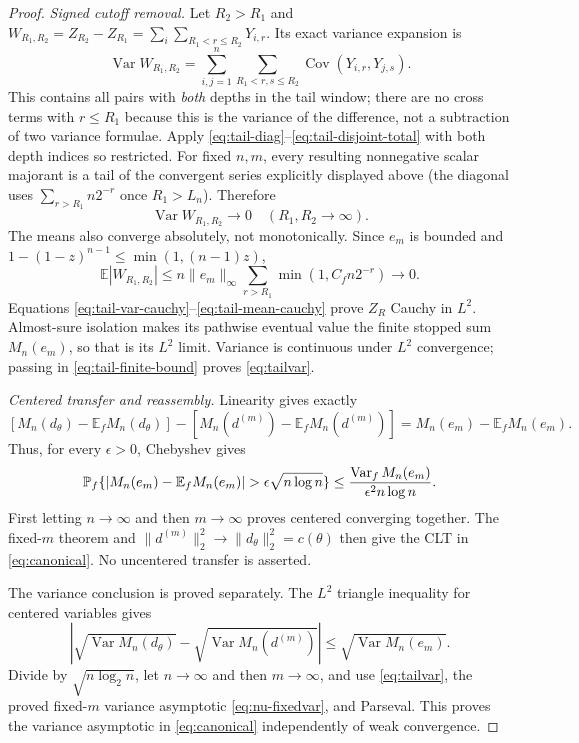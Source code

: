 \documentclass[11pt]{article}
\numberwithin{equation}{section}
\newcommand{\E}{\mathbb E}\newcommand{\Pp}{\mathbb P}
\newcommand{\Var}{\operatorname{Var}}\newcommand{\Cov}{\operatorname{Cov}}
\newcommand{\1}{\mathbf 1}\newcommand{\F}{\mathcal F}\newcommand{\D}{\mathcal D}
\newcommand{\norm}[1]{\lVert#1\rVert}
\begin{document}
\begin{proof}
\emph{Signed cutoff removal.}
Let $R_2>R_1$ and
$W_{R_1,R_2}=Z_{R_2}-Z_{R_1}=\sum_i\sum_{R_1<r\le R_2}Y_{i,r}$.
Its exact variance expansion is
\[
 \Var W_{R_1,R_2}=\sum_{i,j=1}^n
 \sum_{R_1<r,s\le R_2}\Cov(Y_{i,r},Y_{j,s}).
\]
This contains all pairs with \emph{both} depths in the tail window; there are
no cross terms with $r\le R_1$ because this is the variance of the difference,
not a subtraction of two variance formulae.  Apply
\eqref{eq:tail-diag}--\eqref{eq:tail-disjoint-total} with both depth indices
so restricted.  For fixed $n,m$, every resulting nonnegative scalar
majorant is a tail of the convergent series explicitly displayed above
(the diagonal uses $\sum_{r>R_1}n2^{-r}$ once $R_1>L_n$).  Therefore
\begin{equation}\label{eq:tail-var-cauchy}
 \Var W_{R_1,R_2}\longrightarrow0
 \quad(R_1,R_2\to\infty).
\end{equation}
The means also converge absolutely, not monotonically.  Since $e_m$ is
bounded and $1-(1-z)^{n-1}\le\min(1,(n-1)z)$,
\begin{equation}\label{eq:tail-mean-cauchy}
 \E|W_{R_1,R_2}|\le n\norm{e_m}_\infty
 \sum_{r>R_1}\min(1,C_fn2^{-r})\longrightarrow0.
\end{equation}
Equations \eqref{eq:tail-var-cauchy}--\eqref{eq:tail-mean-cauchy} prove
$Z_R$ Cauchy in $L^2$.  Almost-sure isolation makes its pathwise eventual
value the finite stopped sum $M_n(e_m)$, so that is its $L^2$ limit.
Variance is continuous under $L^2$ convergence; passing in
\eqref{eq:tail-finite-bound} proves \eqref{eq:tailvar}.

\emph{Centered transfer and reassembly.}
Linearity gives exactly
\begin{equation}\label{eq:tail-centered-identity}
 [M_n(d_\theta)-\E_fM_n(d_\theta)]
 -[M_n(d^{(m)})-\E_fM_n(d^{(m)})]
 =M_n(e_m)-\E_fM_n(e_m).
\end{equation}
Thus, for every $\epsilon>0$, Chebyshev gives
\[
 \Pp_f\{|M_n(e_m)-\E_fM_n(e_m)|>\epsilon\sqrt{n\log n}\}
 \le {\Var_fM_n(e_m)\over\epsilon^2n\log n}.
\]
First letting $n\to\infty$ and then $m\to\infty$ proves centered converging
together.  The fixed-$m$ theorem and
$\norm{d^{(m)}}_2^2\to\norm{d_\theta}_2^2=c(\theta)$ then give the CLT in
\eqref{eq:canonical}.  No uncentered transfer is asserted.

The variance conclusion is proved separately.  The $L^2$ triangle inequality
for centered variables gives
\[
 \left|\sqrt{\Var M_n(d_\theta)}-
 \sqrt{\Var M_n(d^{(m)})}\right|\le\sqrt{\Var M_n(e_m)}.
\]
Divide by $\sqrt{n\log_2n}$, let $n\to\infty$ and then $m\to\infty$, and
use \eqref{eq:tailvar}, the proved fixed-$m$ variance asymptotic
\eqref{eq:nu-fixedvar}, and Parseval.
This proves the variance asymptotic in \eqref{eq:canonical} independently of
weak convergence.
\end{proof}
\end{document}
